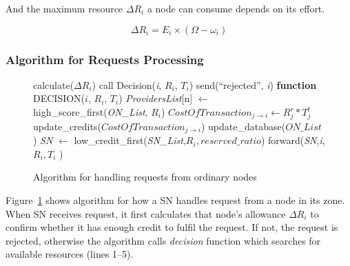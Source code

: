 And the maximum resource ${ { \Delta R } }_{ i }$ a node can consume depends on its effort. 

\begin{equation}
    { \Delta R }_{ i } ={ E }_{ i } \times ( \Omega - { \omega  }_{ i })  
\end{equation}


\subsubsection{Algorithm for Requests Processing}


\begin{figure}[bht!]
    \begin{algorithmic}[1]
        \STATE calculate($\Delta { R }_{ i }$)
            \STATE call Decision(\emph{i}, ${ R }_{ i }$, ${ T }_{ i }$)
        \ELSE
            \STATE send(``rejected'', \emph{i})
        \ENDIF
        \STATE \textbf{function} DECISION(${i}$, ${ R }_{ i }$, ${ T }_{ i }$)
                \STATE  \emph{ProvidersList}[n]  $\leftarrow$ high\_score\_first(\emph{ON\_List}, ${ R }_{ i }$)
                    \STATE ${CostOfTransaction}_{j \rightarrow i} \leftarrow {R}_{ j }^{ r} * {T }_{ j }^{t}$
                \STATE update\_credits(${CostOfTransaction}_{j \rightarrow i}$) 
                \STATE update\_database($ON\_List$)
                \ENDFOR
            \ELSE
                \STATE \emph{SN} $\leftarrow$ low\_credit\_first(\emph{SN\_List},${ R }_{ i }, reserved\_ratio$)
                \STATE forward(\emph{SN},\emph{i}, ${ R }_{ i }, { T }_{ i }$ )
            \ENDIF
    \end{algorithmic}
    \caption{Algorithm for handling requests from ordinary nodes}
    \label{fig:algo}
\end{figure}

Figure~\ref{fig:algo} shows algorithm for how a SN handles request from a node in its zone.
When SN receives request, it first calculates that node's allowance $\Delta {R }_{ i }$ to confirm whether it has enough credit to fulfil the request. 
If not, the request is rejected, otherwise the algorithm calls \emph{decision} function which searches for available resources (lines 1--5).
 
